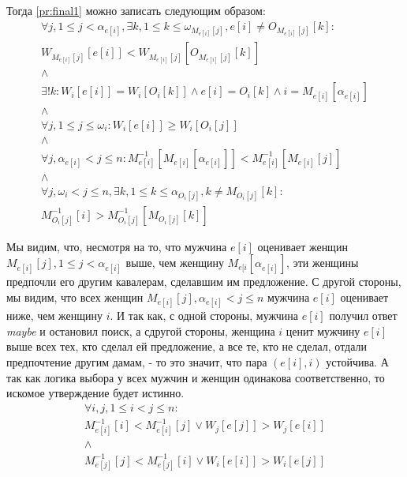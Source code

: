 \documentclass{article}
\begin{document}
Тогда \ref{pr:final1} можно записать следующим образом:
\begin{equation}
    \label{pr:final2}
    \begin{array}{c}
    \forall j, 1 \leq j < \alpha_{e[i]}, \exists k, 1 \leq k \leq \omega_{M_{e[i]}[j]}, e[i] \neq O_{M_{e[i]}[j]}[k] : \\
    W_{M_{e[i]}[j]}[e[i]] < W_{M_{e[i]}[j]}[O_{M_{e[i]}[j]}[k]] \\
    \land \\
    \exists ! k : W_i[e[i]] = W_i[O_i[k]] \land e[i] = O_i[k] \land i = M_{e[i]}[\alpha_{e[i]}] \\
    \land \\
    \forall j, 1 \leq j \leq \omega_i : W_i[e[i]] \geq W_i[O_i[j]] \\
    \land \\
    \forall j, \alpha_{e[i]} < j \leq n : M^{-1}_{e[i]}[M_{e[i]}[\alpha_{e[i]}]] < M^{-1}_{e[i]}[M_{e[i]}[j]] \\
    \land \\
    \forall j, \omega_i < j \leq n, \exists k, 1 \leq k \leq \alpha_{O_i[j]}, k \neq M_{O_i[j]}[k] : \\
    M^{-1}_{O_i[j]}[i] > M^{-1}_{O_i[j]}[M_{O_i[j]}[k]]
    \end{array}
\end{equation}

Мы видим, что, несмотря на то, что мужчина \( e[i] \) оценивает женщин \( M_{e[i]}[j], 1 \leq j < \alpha_{e[i]} \) выше, чем
женщину \( M_{e[i}[\alpha_{e[i]}] \), эти женщины предпочли его другим кавалерам, сделавшим им предложение. С другой стороны,
мы видим, что всех женщин \( M_{e[i]}[j], \alpha_{e[i]} < j \leq n \) мужчина \( e[i] \) оценивает ниже, чем женщину  \( i \).
И так как, с одной стороны, мужчина \( e[i] \) получил ответ \emph{maybe} и остановил поиск, а сдругой стороны,
женщина \( i \) ценит мужчину \( e[i] \) выше всех тех, кто сделал ей предложение, а все те, кто не сделал, отдали предпочтение
другим дамам, - то это значит, что пара \( (e[i],i) \) устойчива. А так как логика выбора у всех мужчин и женщин одинакова
соответственно, то искомое утверждение будет истинно.
\begin{displaymath}
\begin{array}{c}
\forall i, j, 1 \leq i < j \leq n : \\
M^{-1}_{e[i]}[i] < M^{-1}_{e[i]}[j] \lor W_j[e[j]] > W_j[e[i]] \\
\land \\
M^{-1}_{e[j]}[j] < M^{-1}_{e[j]}[i] \lor W_i[e[i]] > W_i[e[j]]
\end{array}
\end{displaymath}
\end{document}

